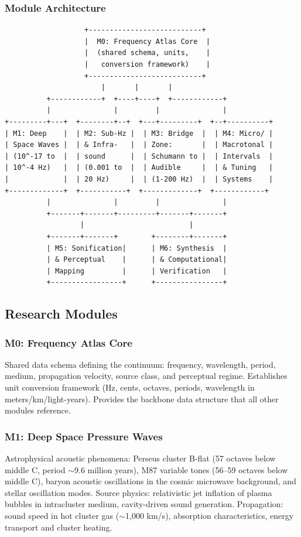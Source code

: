 \documentclass[11pt,letterpaper]{article}
\begin{document}
\subsubsection{Module Architecture}

\begin{asciibox}
\begin{verbatim}
                   +---------------------------+
                   |  M0: Frequency Atlas Core  |
                   |  (shared schema, units,    |
                   |   conversion framework)    |
                   +---------------------------+
                       |       |       |
          +------------+  +----+----+  +------------+
          |               |         |               |
+---------+---+  +--------+--+  +---+---------+  +--+----------+
| M1: Deep    |  | M2: Sub-Hz |  | M3: Bridge  |  | M4: Micro/ |
| Space Waves |  | & Infra-   |  | Zone:       |  | Macrotonal |
| (10^-17 to  |  | sound      |  | Schumann to |  | Intervals  |
| 10^-4 Hz)   |  | (0.001 to  |  | Audible     |  | & Tuning   |
|             |  | 20 Hz)     |  | (1-200 Hz)  |  | Systems    |
+-------------+  +-----------+  +-------------+  +------------+
          |               |         |               |
          +-------+-------+---------+-------+-------+
                  |                         |
          +-------+-------+        +--------+-------+
          | M5: Sonification|      | M6: Synthesis  |
          | & Perceptual    |      | & Computational|
          | Mapping         |      | Verification   |
          +-----------------+      +----------------+
\end{verbatim}
\end{asciibox}

\subsection{Research Modules}

\subsubsection{M0: Frequency Atlas Core}
Shared data schema defining the continuum: frequency, wavelength, period, medium, propagation velocity, source class, and perceptual regime. Establishes unit conversion framework (Hz, cents, octaves, periods, wavelength in meters/km/light-years). Provides the backbone data structure that all other modules reference.

\subsubsection{M1: Deep Space Pressure Waves}
Astrophysical acoustic phenomena: Perseus cluster B-flat (57 octaves below middle C, period $\sim$9.6 million years), M87 variable tones (56--59 octaves below middle C), baryon acoustic oscillations in the cosmic microwave background, and stellar oscillation modes. Source physics: relativistic jet inflation of plasma bubbles in intracluster medium, cavity-driven sound generation. Propagation: sound speed in hot cluster gas ($\sim$1,000 km/s), absorption characteristics, energy transport and cluster heating.
\end{document}
